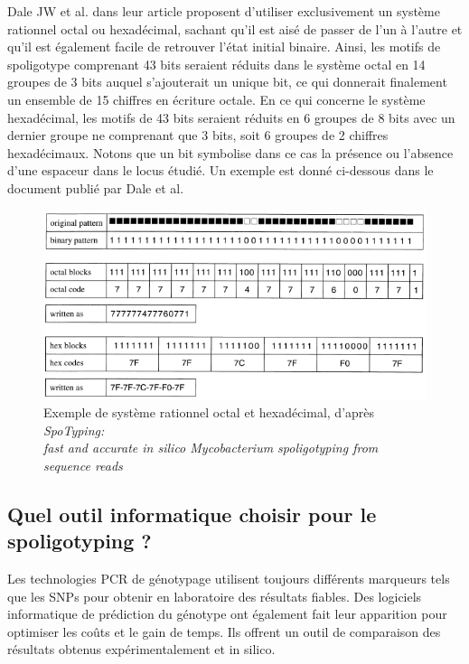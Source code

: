 \documentclass[twoside,a4paper,11pt,frenchb,openany]{report}
\begin{document}
Dale JW et al. dans leur article \cite{dale} proposent d'utiliser exclusivement un système rationnel octal ou hexadécimal, sachant qu'il est aisé de passer de l'un à l'autre et qu'il est également facile de retrouver l'état initial binaire. Ainsi, les motifs de spoligotype comprenant 43 bits seraient réduits dans le système octal en 14 groupes de 3 bits auquel s'ajouterait un unique bit, ce qui donnerait finalement un ensemble de 15 chiffres en écriture octale. En ce qui concerne le système hexadécimal, les motifs de 43 bits seraient réduits en 6 groupes de 8 bits avec un dernier groupe ne comprenant que 3 bits, soit 6 groupes de 2 chiffres hexadécimaux. Notons que un bit symbolise dans ce cas la présence ou l'absence d'une espaceur dans le locus étudié. Un exemple est donné ci-dessous dans le document \cite{dale} publié par Dale et al.

\begin{figure}

\includegraphics[scale=0.6]{hexa.png}
\caption{Exemple de système rationnel octal et hexadécimal, d'après \textit{SpoTyping:\\ fast and accurate in silico Mycobacterium spoligotyping from sequence reads}}
\end{figure}


\subsection{Quel outil informatique choisir pour le spoligotyping ?}

Les technologies PCR de génotypage utilisent toujours différents marqueurs tels que les SNPs pour obtenir en laboratoire des résultats fiables. Des logiciels informatique de prédiction du génotype ont également fait leur apparition pour optimiser les coûts et le gain de temps. Ils offrent un outil de comparaison des résultats obtenus expérimentalement et in silico.
\end{document}
